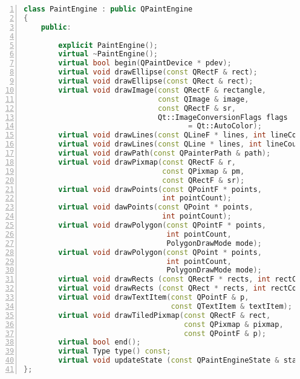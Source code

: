 \begin{lstlisting}[language=C++,numbers=left,caption=Nagłówek klasy \emph{QPaintEngine}]
class PaintEngine : public QPaintEngine
{
    public:

        explicit PaintEngine();
        virtual ~PaintEngine();
        virtual bool begin(QPaintDevice * pdev);
        virtual void drawEllipse(const QRectF & rect);
        virtual void drawEllipse(const QRect & rect);
        virtual void drawImage(const QRectF & rectangle, 
                               const QImage & image, 
                               const QRectF & sr,
                               Qt::ImageConversionFlags flags 
                                      = Qt::AutoColor);
        virtual void drawLines(const QLineF * lines, int lineCount);
        virtual void drawLines(const QLine * lines, int lineCount);
        virtual void drawPath(const QPainterPath & path);
        virtual void drawPixmap(const QRectF & r, 
                                const QPixmap & pm, 
                                const QRectF & sr);
        virtual void drawPoints(const QPointF * points, 
                                int pointCount);
        virtual void dawPoints(const QPoint * points, 
                                int pointCount);
        virtual void drawPolygon(const QPointF * points, 
                                 int pointCount, 
                                 PolygonDrawMode mode);
        virtual void drawPolygon(const QPoint * points, 
                                 int pointCount, 
                                 PolygonDrawMode mode);
        virtual void drawRects (const QRectF * rects, int rectCount);
        virtual void drawRects (const QRect * rects, int rectCount);
        virtual void drawTextItem(const QPointF & p, 
                                  const QTextItem & textItem);
        virtual void drawTiledPixmap(const QRectF & rect, 
                                     const QPixmap & pixmap, 
                                     const QPointF & p);
        virtual bool end();
        virtual Type type() const;
        virtual void updateState (const QPaintEngineState & state);
};
\end{lstlisting}